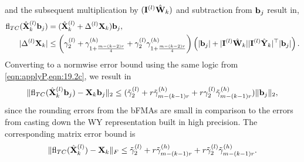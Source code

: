 and the subsequent multiplication by $(\mathbf{I}^{(l)}\hat{\mathbf{W}}_k)$ and subtraction from $\mathbf{b}_j$ result in,
\begin{align*}
	\mathrm{fl}_{TC}(\hat{\mathbf{X}}_{k}^{(l)}\mathbf{b}_j) &= (\hat{\mathbf{X}}_{k}^{(l)}+\Delta^{(l)}\mathbf{X}_k)\mathbf{b}_j,\\
	|\Delta^{(l)}\mathbf{X}_k| &\leq \left(\gamma_2^{(l)}+\gamma_{1+\frac{m-(k-2)r}{4}}^{(h)}+\gamma_2^{(l)}\gamma_{1+\frac{m-(k-2)r}{4}}^{(h)}\right)\left(|\mathbf{b}_j|+|\mathbf{I}^{(l)}\hat{\mathbf{W}}_k||\mathbf{I}^{(l)}\hat{\mathbf{Y}}_k|^{\top}|\mathbf{b}_j|\right).
\end{align*}
Converting to a normwise error bound using the same logic from \cref{eqn:applyP,eqn:19.2c}, we result in  
\begin{equation}
\|\mathrm{fl}_{TC}(\hat{\mathbf{X}}_{k}^{(l)}\mathbf{b}_j)-\mathbf{X}_k\mathbf{b}_j\|_2 \leq (\tilde{\gamma}_2^{(l)} +r\tilde{\gamma}_{m-(k-1)r}^{(h)} + r\gamma_2^{(l)}\tilde{\gamma}_{m-(k-1)r}^{(h)}) \|\mathbf{b}_j\|_2, 
\end{equation}
since the rounding errors from the bFMAs are small in comparison to the errors from casting down the WY representation built in high precision.
The corresponding matrix error bound is
\begin{equation}
	\|\fl_{TC}(\hat{\bb{X}}_{k}^{(l)})-\bb{X}_k\|_F \leq \tilde{\gamma}_2^{(l)} +r\tilde{\gamma}_{m-(k-1)r}^{(h)} + r\tilde{\gamma}_2^{(l)}\tilde{\gamma}_{m-(k-1)r}^{(h)}.\label{eqn:mpdeltX}
\end{equation}

